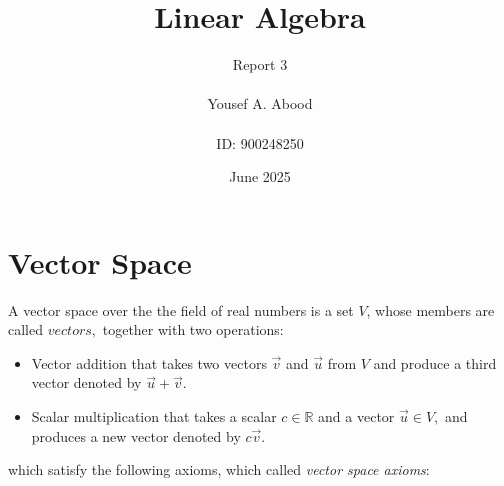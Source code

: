 \documentclass[a4paper,12pt]{article}
\title{Linear Algebra}
\author{Report 3\\ \\ Yousef A. Abood\\ \\ ID: 900248250}
\date{June 2025}
\begin{document}
\maketitle
\noindent\makebox[\linewidth]{\rule{15cm}{0.4pt}}
\section{Vector Space}
A vector space over the the field of real numbers is a set $V$, whose members are called $vectors,$ together with two operations:
\begin{itemize}
    \item Vector addition that takes two vectors $\vec{v}$ and $\vec{u}$ from $V$ and produce a third vector denoted by $\vec{u}+\vec{v}$.
    \item Scalar multiplication that takes a scalar $c \in \mathbb{R}$ and a vector $\vec{u}\in V,$ and produces a new vector denoted by $c\vec{v}.$
\end{itemize}
which satisfy the following axioms, which called \textit{vector space axioms}:
\end{document}

